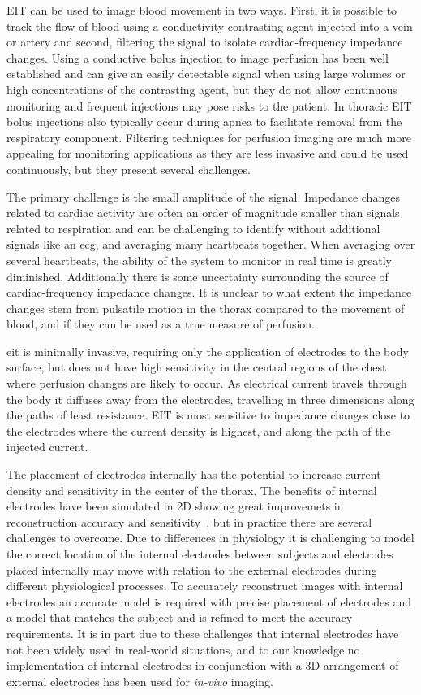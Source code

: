 EIT can be used to image blood movement in two ways. 
First, it is possible to track the flow of blood using a 
conductivity-contrasting agent injected into a vein or artery
and second, filtering the signal to isolate cardiac-frequency 
impedance changes. 
Using a conductive bolus injection to image perfusion has been well established and 
can give an easily detectable signal when using large volumes
or high concentrations of the contrasting agent, but they do not 
allow continuous monitoring and frequent injections may pose 
risks to the patient.
In thoracic EIT bolus injections also typically occur during apnea to 
facilitate removal from the respiratory component.
Filtering techniques for perfusion imaging are much more appealing for 
monitoring applications as they are less invasive 
and could be used continuously, but they present several challenges. 

The primary challenge is the small amplitude of the signal. 
Impedance changes related to cardiac activity are often an order of
magnitude smaller than signals related to respiration and can be challenging to identify without additional signals like 
an \acrfull{ecg}, and averaging many heartbeats together. When 
averaging over several heartbeats, the ability of the system to 
monitor in real time is greatly diminished. Additionally 
there is some uncertainty surrounding the source of
cardiac-frequency impedance changes. It is unclear to what 
extent the impedance changes stem from pulsatile
motion in the thorax compared to the movement of blood, 
and if they can be used as a true measure of perfusion. 

\acrshort{eit} is minimally invasive, requiring only 
the application of electrodes to the body surface, but 
does not have high sensitivity in the central regions 
of the chest where perfusion changes are likely to occur.
As electrical current travels through the body it diffuses away from 
the electrodes,
travelling in three dimensions along the paths of least resistance. 
EIT is most sensitive to impedance changes close to the electrodes
where the current density is highest, 
and along the path of the injected current.

The placement of electrodes internally has the 
potential to increase current density and sensitivity in 
the center of the thorax. 
The benefits of internal electrodes have been simulated 
in 2D showing great improvemets in reconstruction accuracy 
and sensitivity~\parencite{tehrani_modelling_2012}, but 
in practice there are several challenges to overcome. 
Due to differences in physiology it is challenging to model
the correct location of the internal electrodes between subjects
and electrodes placed internally may move with relation 
to the external electrodes during different physiological
processes.  
To accurately reconstruct images with internal electrodes 
an accurate model is required with precise placement of electrodes
and a model that matches the subject and is refined 
to meet the accuracy requirements. 
It is in part due to these challenges that internal electrodes 
have not been widely used in real-world situations, and to our knowledge 
no implementation of internal electrodes in conjunction 
with a 3D arrangement of external electrodes has been used for \emph{in-vivo}
imaging.

